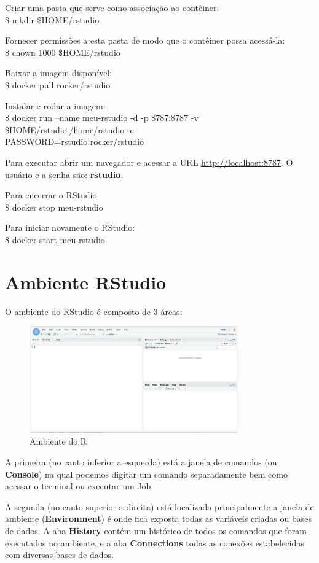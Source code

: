 \documentclass[a4paper,11pt]{article}
\begin{document}
Criar uma pasta que serve como associação ao contêiner: \\
{\ttfamily\$ mkdir \$HOME/rstudio}

Fornecer permissões a esta pasta de modo que o contêiner possa acessá-la: \\
{\ttfamily\$ chown 1000 \$HOME/rstudio}

Baixar a imagem disponível: \\
{\ttfamily\$ docker pull rocker/rstudio}

Instalar e rodar a imagem: \\
{\ttfamily\$ docker run --name meu-rstudio -d -p 8787:8787 -v \$HOME/rstudio:/home/rstudio -e \\ PASSWORD=rstudio rocker/rstudio}

Para executar abrir um navegador e acessar a URL \url{http://localhost:8787}. O usuário e a senha são: \textbf{rstudio}.

Para encerrar o RStudio: \\
{\ttfamily\$ docker stop meu-rstudio} 

Para iniciar novamente o RStudio: \\
{\ttfamily\$ docker start meu-rstudio} 

\section{Ambiente RStudio}
O ambiente do RStudio é composto de 3 áreas:
\begin{figure}[H]
	\centering
	\includegraphics[width=0.8\textwidth]{imagens/RStudio.png}
	\caption{Ambiente do R}
\end{figure}

A primeira (no canto inferior a esquerda) está a janela de comandos (ou \textbf{Console}) na qual podemos digitar um comando separadamente bem como acessar o terminal ou executar um Job.

A segunda (no canto superior a direita) está localizada principalmente a janela de ambiente (\textbf{Environment}) é onde fica exposta todas as variáveis criadas ou bases de dados. A aba \textbf{History} contém um histórico de todos os comandos que foram executados no ambiente, e a aba \textbf{Connections} todas as conexões estabelecidas com diversas bases de dados.
\end{document}
